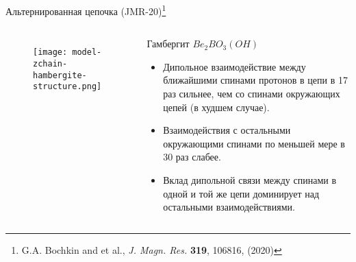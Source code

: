 \begin{frame}{Альтернированная цепочка (JMR-20)\footnote[frame]{
        G.A. Bochkin and et al., \textit{J. Magn. Res.} \textbf{319}, 106816, (2020)}}
\begin{columns}

    \begin{figure}
      \texttt{[image: model-zchain-hambergite-structure.png]}
      \caption{}
    \end{figure}

    \begin{block}{Гамбергит $Be_2BO_3(OH)$ }
        \begin{itemize}
            \item Дипольное взаимодействие между ближайшими спинами протонов в цепи в 17 раз сильнее, чем со спинами окружающих цепей (в худшем случае).
            \item Взаимодействия с остальными окружающими спинами по меньшей мере в 30 раз слабее.
            \item Вклад дипольной связи между спинами в одной и той же цепи доминирует над остальными взаимодействиями.
        \end{itemize}
    \end{block}

\end{columns}
\end{frame}
